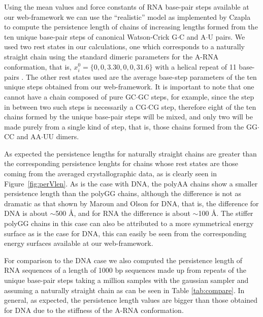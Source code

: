 Using  the mean  values and  force  constants of  RNA base-pair  steps
available at our  web-framework we can use the  ``realistic'' model as
implemented  by  Czapla~\cite{czapla2006}  to compute  the  persistence
length  of chains  of increasing  lengths formed  from the  ten unique
base-pair  steps  of canonical  Watson-Crick  G$\cdot$C and  A$\cdot$U
pairs.   We  used two  rest  states  in  our calculations,  one  which
corresponds to  a naturally straight chain using  the standard dimeric
parameters for  the A-RNA conformation,  that is, $x_{i}^{0} =  \{0, 0,
  3.30,  0,  0,  31.6\}$ with   a  helical  repeat  of  11  base-pairs
\cite{arnott1999}.   The  other  rest  states  used  are  the  average
base-step   parameters   of the ten unique steps obtained   from   our
web-framework. It is  important to  note that one  cannot have  a chain
composed of  pure GC$\cdot$GC  steps, for example,  since the  step in
between two  such steps is  necessarily a CG$\cdot$CG  step, therefore
eight of the  ten chains formed by the unique  base-pair steps will be
mixed, and  only two will be made  purely from a single  kind of step,
that  is, those  chains formed  from the  GG$\cdot$CC  and AA$\cdot$UU
dimers.

As expected the persistence  lengths for naturally straight chains are
greater  than the  corresponding persistence  lenghts for  chains whose
rest states are those  coming from the averaged crystallographic data,
as is  clearly seen in  Figure~\ref{fig:perVlen}. As is the  case with
DNA,  the polyAA  chains show  a smaller  persistence length  than the
polyGG  chains, although  the difference  is not  as dramatic  as that
shown by  Maroun and  Olson \cite{maroun1988a} for  DNA, that  is, the
difference for DNA is about  $\sim$500 \AA, and for RNA the difference
is about $\sim$100 \AA.  The stiffer polyGG chains in this case can
also be attributed to a more symmetrical energy surface as is the case
for  DNA,  this can  easily  be  seen  from the  corresponding  energy
surfaces available at our web-framework.

For comparison to the DNA case we also computed the persistence length
of RNA sequences of a length of 1000 bp sequences made up from repeats
of  the unique  base-pair  steps  taking a  million  samples with  the
gaussian sampler  and assuming  a naturally straight  chain as  can be
seen  in  Table  \ref{tab:compare}.   In  general,  as  expected,  the
persistence length values  are bigger than those obtained  for DNA due
to the stiffness of the A-RNA conformation.

